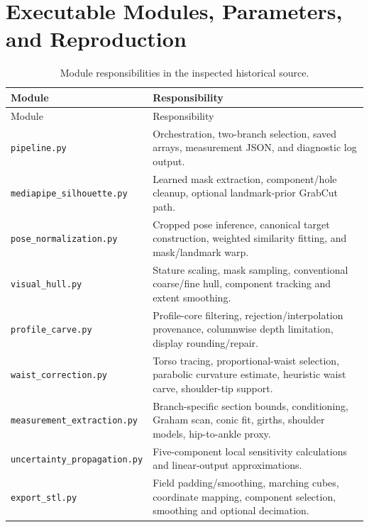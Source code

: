 \section{Executable Modules, Parameters, and Reproduction}
\label{app:reproduction}
\begin{longtable}{p{4.2cm}p{10.5cm}}
\caption{Module responsibilities in the inspected historical source.}\label{tab:modules}\\
\toprule
Module & Responsibility \\
\midrule
\endfirsthead
\toprule Module & Responsibility \\
\midrule
\endhead
\bottomrule\endfoot
\texttt{pipeline.py} & Orchestration, two-branch selection, saved arrays, measurement JSON, and diagnostic log output. \\
\texttt{mediapipe\_silhouette.py} & Learned mask extraction, component/hole cleanup, optional landmark-prior GrabCut path. \\
\texttt{pose\_normalization.py} & Cropped pose inference, canonical target construction, weighted similarity fitting, and mask/landmark warp. \\
\texttt{visual\_hull.py} & Stature scaling, mask sampling, conventional coarse/fine hull, component tracking and extent smoothing. \\
\texttt{profile\_carve.py} & Profile-core filtering, rejection/interpolation provenance, columnwise depth limitation, display rounding/repair. \\
\texttt{waist\_correction.py} & Torso tracing, proportional-waist selection, parabolic curvature estimate, heuristic waist carve, shoulder-tip support. \\
\texttt{measurement\_extraction.py} & Branch-specific section bounds, conditioning, Graham scan, conic fit, girths, shoulder models, hip-to-ankle proxy. \\
\texttt{uncertainty\_propagation.py} & Five-component local sensitivity calculations and linear-output approximations. \\
\texttt{export\_stl.py} & Field padding/smoothing, marching cubes, coordinate mapping, component selection, smoothing and optional decimation. \\
\end{longtable}

